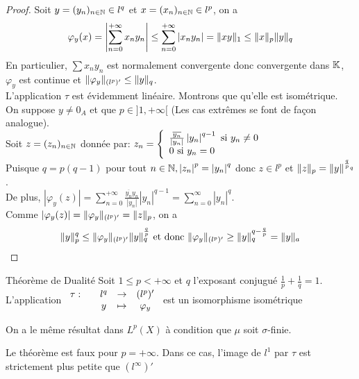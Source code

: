 \documentclass[]{report}
\begin{document}
    \begin{proof}
        Soit $y=(y_n)_{n\in\mathbb{N}}\in l^q$ et $x=(x_n)_{n\in\mathbb{N}}\in l^p$, on a
        \[\varphi_y(x)=\left|\sum_{n=0}^{+\infty}x_n y_n\right|\le \sum_{n=0}^{+\infty}\left| x_n y_n\right|=\lVert xy \rVert_1\le \lVert x \rVert_p \lVert y \rVert_q\]
        En particulier, $\sum x_n y_n$ est normalement convergente donc convergente dans $\mathbb{K}$, $\varphi_y$ est continue et $\lVert \varphi_y \rVert_{(l^p)'}\le \lVert y \rVert_q$.\\
        L'application $\tau$ est évidemment linéaire. Montrons que qu'elle est isométrique.\\
        On suppose $y\neq 0_A$ et que $p\in ]1,+\infty[$ (Les cas extrêmes se font de façon analogue).\\
        Soit $z=(z_n)_{n\in\mathbb{N}}$ donnée par: $z_n=\left\{\begin{array}{ll} \frac{\overline{y_n}}{\left| y_n \right| }\left| y_n\right|^{q-1}\text{ si $y_n\neq 0$}\\ 0\text{ si }y_n =0 \end{array} \right.$\\
        Puisque $q=p(q-1)$ pour tout $n\in \mathbb{N}, \left|z_n \right|^p=\left| y_n \right|^q$ donc $z\in l^p$ et $\lVert z \rVert_p=\lVert y \rVert^{\frac{q}{p}_q}$. \\ 
        De plus, $\left| \varphi_y(z)\right|=\sum_{n=0}^{+\infty} \frac{\overline{y_n}y_n}{\left|y_n\right|}\left|y_n\right|^{q-1}=\sum_{n=0}^{\infty} \left| y_n\right|^q$.\\
        Comme $\left|\varphi_y (z)\right| =\lVert \varphi_y \rVert_{(l^p)'}=\lVert z \rVert_p$, on a
        \[\lVert y \rVert_p^q\le \lVert \varphi_y \rVert_{(l^p)'}\lVert y \rVert_q^{\frac{q}{p}}\text{ et donc }\lVert \varphi_y \rVert_{(l^p)'}\ge \lVert y \rVert_q^{q-\frac{q}{p}}=\lVert y \rVert_a\] 
    \end{proof}

    \begin{tm}{Théorème de Dualité}{}
        Soit $1\le p<+\infty$ et $q$ l'exposant conjugué $\frac{1}{p}+ \frac{1}{q}=1$. L'application $\begin{array}{ccccc} \tau : & & l^q & \to & (l^p)' \\ & & y & \mapsto & \varphi_y \end{array}$ est un isomorphisme isométrique
    \end{tm}

    \begin{re}{}{}
        On a le même résultat dans $L^p(X)$ à condition que $\mu$ soit $\sigma$-finie.
    \end{re}

    \begin{re}{}{}
        Le théorème est faux pour $p=+\infty$. Dans ce cas, l'image de $l^1$ par $\tau$ est strictement plus petite que $(l^\infty)'$
    \end{re}
\end{document}
